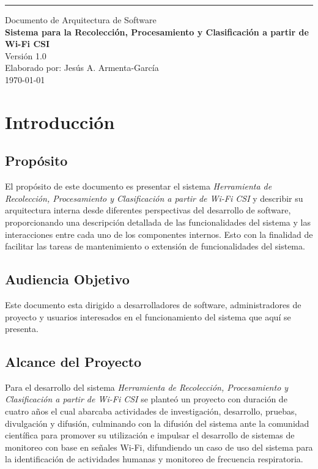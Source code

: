 \documentclass{scrreprt}
\date{}
\def\myversion{1.0 }
\begin{document}
\begin{flushright}
    \rule{16cm}{5pt}\vskip1cm
    \begin{bfseries}
        \Huge{Documento de Arquitectura de Software}\\
        \vspace{1.5cm}
        \textbf{Sistema para la Recolección, Procesamiento y Clasificación a partir de Wi-Fi CSI}\\
        \vspace{1.5cm}
        \LARGE{Versión \myversion}\\
        \vspace{1.5cm}
        Elaborado por: Jesús A. Armenta-García\\
        \vspace{1.5cm}
        \today\\
    \end{bfseries}
\end{flushright}

\tableofcontents

\chapter{Introducción}

\section{Propósito}
El propósito de este documento es presentar el sistema \emph{Herramienta de Recolección, Procesamiento y Clasificación a partir de Wi-Fi CSI} y describir su arquitectura interna desde diferentes perspectivas del desarrollo de software, proporcionando una descripción detallada de las funcionalidades del sistema y las interacciones entre cada uno de los componentes internos. Esto con la finalidad de facilitar las tareas de mantenimiento o extensión de funcionalidades del sistema. 

\section{Audiencia Objetivo}
Este documento esta dirigido a desarrolladores de software, administradores de proyecto y usuarios interesados en el funcionamiento del sistema que aquí se presenta. 

\section{Alcance del Proyecto}
Para el desarrollo del sistema \emph{Herramienta de Recolección, Procesamiento y Clasificación a partir de Wi-Fi CSI} se planteó un proyecto con duración de cuatro años el cual abarcaba actividades de investigación, desarrollo, pruebas, divulgación y difusión, culminando con la difusión del sistema ante la comunidad científica para promover su utilización e impulsar el desarrollo de sistemas de monitoreo con base en señales Wi-Fi, difundiendo un caso de uso del sistema para la identificación de actividades humanas y monitoreo de frecuencia respiratoria. 
\end{document}
